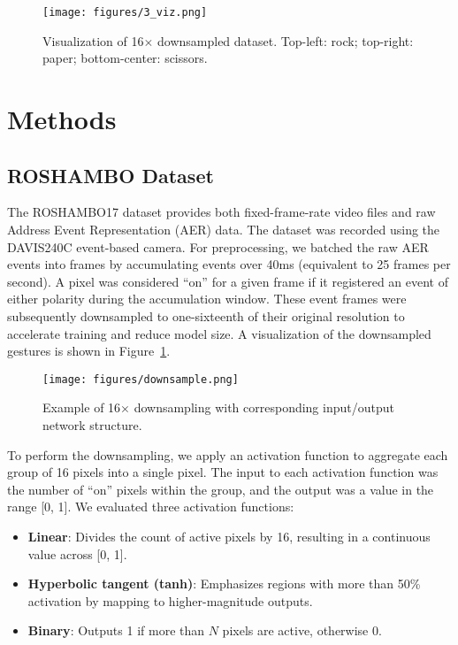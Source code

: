 \documentclass[conference]{IEEEtran}
\begin{document}
\begin{figure}[!ht]
\centering
\texttt{[image: figures/3\_viz.png]}
\caption{Visualization of 16$\times$ downsampled dataset. Top-left: rock; top-right: paper; bottom-center: scissors.}
\label{fig:viz_data}
\end{figure}

\section{Methods}

\subsection{ROSHAMBO Dataset}

The ROSHAMBO17 dataset provides both fixed-frame-rate video files and raw Address Event Representation (AER) data. The dataset was recorded using the DAVIS240C event-based camera. For preprocessing, we batched the raw AER events into frames by accumulating events over 40ms (equivalent to 25 frames per second). A pixel was considered ``on'' for a given frame if it registered an event of either polarity during the accumulation window. These event frames were subsequently downsampled to one-sixteenth of their original resolution to accelerate training and reduce model size. A visualization of the downsampled gestures is shown in Figure~\ref{fig:viz_data}.

\begin{figure}[!ht]
\centering
\texttt{[image: figures/downsample.png]}
\caption{Example of 16$\times$ downsampling with corresponding input/output network structure.}
\label{fig:downsample}
\end{figure}

To perform the downsampling, we apply an activation function to aggregate each group of 16 pixels into a single pixel. The input to each activation function was the number of ``on'' pixels within the group, and the output was a value in the range [0, 1]. We evaluated three activation functions:

\begin{itemize}
    \item \textbf{Linear}: Divides the count of active pixels by 16, resulting in a continuous value across [0, 1].
    \item \textbf{Hyperbolic tangent (tanh)}: Emphasizes regions with more than 50\% activation by mapping to higher-magnitude outputs.
    \item \textbf{Binary}: Outputs 1 if more than $N$ pixels are active, otherwise 0.
\end{itemize}
\end{document}
